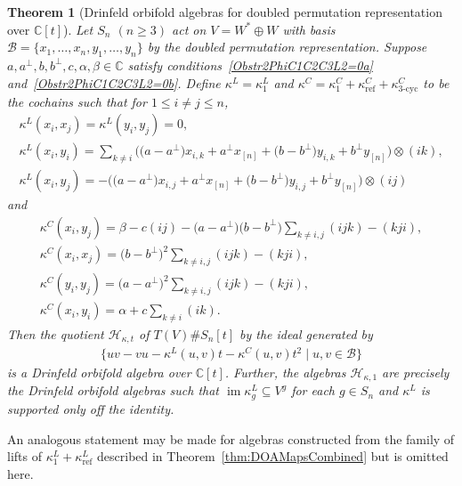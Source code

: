 \documentclass[10pt,a4paper]{amsart}
\numberwithin{equation}{section}
\newtheorem{Theorem}{Theorem}[section]
\DeclareMathOperator{\im}{im}
\DeclareMathOperator{\refl}{ref}
\DeclareMathOperator{\tri}{3-cyc}
\begin{document}
\begin{Theorem}[{Drinfeld orbifold algebras for doubled permutation representation over $\mathbb{C}[t]$}]
\label{permexamples}
Let $S_n$ $(n \geq 3)$ act on $V=W^* \oplus W$ with basis
$\mathcal{B}=\{x_1,\dots,x_n,y_1,\dots,y_n\}$ by the doubled permutation
representation. Suppose $a,a^\perp,b,b^\perp,c,\alpha,\beta \in \mathbb{C}$ %
satisfy conditions~\eqref{Obstr2PhiC1C2C3L2=0a} and~\eqref{Obstr2PhiC1C2C3L2=0b}.
Define $\kappa^L=\kappa_1^L$ and $\kappa^C=\kappa_1^C+\kappa_{\refl}^C+\kappa_{\tri}^C$
to be the cochains such that for $1 \leq i \neq j \leq n$,
\begin{gather*}
\kappa^L(x_i,x_j)=\kappa^L(y_i,y_j)=0, \\
\kappa^L(x_i,y_i)=\textstyle\sum\limits_{k \neq i}\big( \big(a-a^\perp\big)x_{i,k}+a^\perp x_{[n]}+\big(b-b^\perp\big)y_{i,k}+b^\perp y_{[n]}\big) \otimes (ik), \\
\kappa^L(x_i,y_j)=-\big(\big(a-a^\perp\big)x_{i,j}+a^\perp x_{[n]}+\big(b-b^\perp\big)y_{i,j}+b^\perp y_{[n]}\big) \otimes (ij)
\end{gather*}
and
\begin{gather*}
\kappa^C(x_i,y_j)=\beta-c(ij)-\big(a-a^\perp\big)\big(b-b^\perp\big)\textstyle\sum\limits_{k \neq i,j} (ijk)-(kji), \\
\kappa^C(x_i,x_j)=\big(b-b^\perp\big)^2 \textstyle\sum\limits_{k \neq i,j} (ijk)-(kji), \\
\kappa^C(y_i,y_j)=\big(a-a^\perp\big)^2 \textstyle\sum\limits_{k \neq i,j} (ijk)-(kji), \\
\kappa^C(x_i,y_i)=\alpha+c\textstyle\sum\limits_{k \neq i} (ik).
\end{gather*}
Then the quotient $\mathcal{H}_{\kappa,t}$ of $T(V) \# S_n[t]$ by the ideal generated by
\begin{gather*}
\big\{uv-vu - \kappa^L(u,v) t -\kappa^C(u,v) t^2 \mid u,v \in \mathcal{B} \big\}
\end{gather*}
is a Drinfeld orbifold algebra over $\mathbb{C}[t]$.
Further, the algebras $\mathcal{H}_{\kappa,1}$ are precisely the Drinfeld orbifold
algebras such that $\im\kappa^L_g\subseteq V^g$ for each $g\in S_n$ and $\kappa^L$
is supported only off the identity.
\end{Theorem}

An analogous statement may be made for algebras constructed from the family of
lifts of $\kappa^L_1+\kappa^L_{\refl}$ described in Theorem~\ref{thm:DOAMapsCombined}
but is omitted here.
\end{document}
